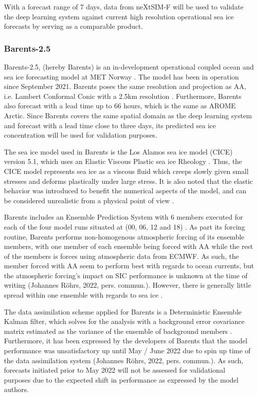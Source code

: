 \documentclass[../main/thesis.tex]{subfiles}
\begin{document}
With a forecast range of 7 days, data from neXtSIM-F will be used to validate the deep learning system against current high resolution operational sea ice forecasts by serving as a comparable product.

\subsubsection{Barents-2.5}
Barents-2.5, (hereby Barents) is an in-development operational coupled ocean and sea ice forecasting model at MET Norway \citep{Roehrs2022}. The model has been in operation since September 2021. Barents poses the same resolution and projection as AA, i.e. Lambert Conformal Conic with a 2.5km resolution \citep{Roehrs2022,Mueller2017}. Furthermore, Barents also forecast with a lead time up to 66 hours, which is the same as AROME Arctic. Since Barents covers the same spatial domain as the deep learning system and forecast with a lead time close to three days, its predicted sea ice concentration will be used for validation purposes.

The sea ice model used in Barents is the Los Alamos sea ice model (CICE) version 5.1, which uses an Elastic Viscous Plastic sea ice Rheology \citep{Hunke2015}. Thus, the CICE model represents sea ice as a viscous fluid which creeps slowly given small stresses and deforms plastically under large stress. It is also noted that the elastic behavior was introduced to benefit the numerical aspects of the model, and can be considered unrealistic from a physical point of view \citep{Hunke1997}.

Barents includes an Ensemble Prediction System with 6 members executed for each of the four model runs situated at (00, 06, 12 and 18) \citep{Roehrs2022}. As part its forcing routine, Barents performs non-homogenous atmospheric forcing of its ensemble members, with one member of each ensemble being forced with AA while the rest of the members is forces using atmospheric data from ECMWF. As such, the member forced with AA seem to perform best with regards to ocean currents, but the atmospheric forcing's impact on SIC performance is unknown at the time of writing (Johannes Röhrs, 2022, pers. commun.). However, there is generally little spread within one ensemble with regards to sea ice \citep{Roehrs2022}.

The data assimilation scheme applied for Barents is a Deterministic Ensemble Kalman filter, which solves for the analysis with a background error covariance matrix estimated as the variance of the ensemble of background members \citep{Roehrs2022}. Furthermore, it has been expressed by the developers of Barents that the model performance was unsatisfactory up until May / June 2022 due to spin up time of the data assimilation system (Johannes Röhrs, 2022, pers. commun.). As such, forecasts initiated prior to May 2022 will not be assessed for validational purposes due to the expected shift in performance as expressed by the model authors.
\end{document}
